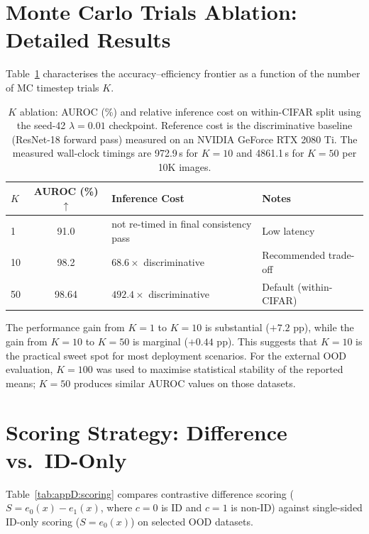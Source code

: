 \section{Monte Carlo Trials Ablation: Detailed Results}
\label{app:additional-results:mc-trials}

Table~\ref{tab:appD:k-ablation} characterises the accuracy--efficiency frontier as a function of the number of MC timestep trials $K$.

\begin{table}[htbp]
  \centering
  \caption{$K$ ablation: AUROC (\%) and relative inference cost on within-CIFAR split using the seed-42 $\lambda{=}0.01$ checkpoint. Reference cost is the discriminative baseline (ResNet-18 forward pass) measured on an NVIDIA GeForce RTX 2080 Ti. The measured wall-clock timings are 972.9\,s for $K{=}10$ and 4861.1\,s for $K{=}50$ per 10K images.}
  \label{tab:appD:k-ablation}
  \begin{tabular}{lclp{4cm}}
    \toprule
    $K$ & AUROC (\%) $\uparrow$ & Inference Cost & Notes \\
    \midrule
    1 & 91.0 & not re-timed in final consistency pass & Low latency \\
    10 & 98.2 & $68.6\times$ discriminative & Recommended trade-off \\
    50 & 98.64 & $492.4\times$ discriminative & Default (within-CIFAR) \\
    \bottomrule
  \end{tabular}
\end{table}

The performance gain from $K{=}1$ to $K{=}10$ is substantial ($+7.2$ pp), while the gain from $K{=}10$ to $K{=}50$ is marginal ($+0.44$ pp). This suggests that $K{=}10$ is the practical sweet spot for most deployment scenarios. For the external OOD evaluation, $K{=}100$ was used to maximise statistical stability of the reported means; $K{=}50$ produces similar AUROC values on those datasets.


\section{Scoring Strategy: Difference vs.\ ID-Only}
\label{app:additional-results:scoring}

Table~\ref{tab:appD:scoring} compares contrastive difference scoring ($S = e_0(x) - e_1(x)$, where $c = 0$ is ID and $c = 1$ is non-ID) against single-sided ID-only scoring ($S = e_0(x)$) on selected OOD datasets.

